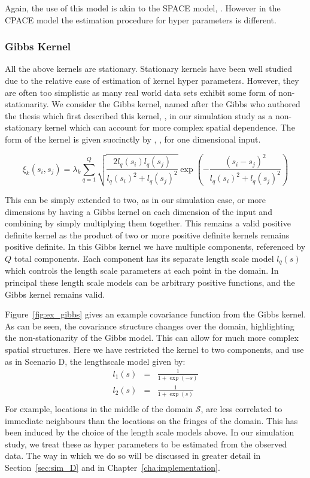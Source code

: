 Again, the use of this model is akin to the SPACE model, \citep{liu_functional_2017}.
However in the CPACE model the estimation procedure for hyper parameters is different.

\subsubsection{Gibbs Kernel \label{sssec:gibbs}}
All the above kernels are stationary.
Stationary kernels have been well studied due to the relative ease of estimation of kernel hyper parameters.
However, they are often too simplistic as many real world data sets exhibit some form of non-stationarity.
We consider the Gibbs kernel, named after the Gibbs who authored the thesis which first described this kernel, \citep{gibbs_bayesian_1998}, in our simulation study as a non-stationary kernel which can account for more complex spatial dependence.
The form of the kernel is given succinctly by \citeauthor{paciorek_spatial_2006}, \citep{paciorek_spatial_2006}, for one dimensional input. 

\begin{equation}
	\xi_k\left(s_{i}, s_{j}\right) = \lambda_k \sum_{q=1}^{Q} \sqrt{\frac{2l_q(s_i)l_q(s_j)}{l_q(s_i)^2 + l_q(s_j)^2}} \exp \left(-\frac{\left(s_i - s_j\right)^2}{l_q(s_i)^2 + l_q(s_j)^2}\right)
\end{equation}

This can be simply extended to two, as in our simulation case, or more dimensions by having a Gibbs kernel on each dimension of the input and combining by simply multiplying them together.
This remains a valid positive definite kernel as the product of two or more positive definite kernels remains positive definite. 
In this Gibbs kernel we have multiple components, referenced by $Q$ total components.
Each component has its separate length scale model $l_q(s)$ which controls the length scale parameters at each point in the domain.
In principal these length scale models can be arbitrary positive functions, and the Gibbs kernel remains valid.

Figure~\ref{fig:ex_gibbs} gives an example covariance function from the Gibbs kernel.
As can be seen, the covariance structure changes over the domain, highlighting the non-stationarity of the Gibbs model.
This can allow for much more complex spatial structures.
Here we have restricted the kernel to two components, and use as in Scenario D, the lengthscale model given by:
\begin{eqnarray}
	l_1(s) &=& \frac{1}{1 + \exp(-s)} \nonumber \\
	l_2(s) &=& \frac{1}{1 +  \exp(s)} \nonumber \\
\end{eqnarray}
For example, locations in the middle of the domain $\mathcal{S}$, are less correlated to immediate neighbours than the locations on the fringes of the domain.
This has been induced by the choice of the length scale models above.
In our simulation study, we treat these as hyper parameters to be estimated from the observed data.
The way in which we do so will be discussed in greater detail in Section~\ref{sec:sim_D} and in Chapter~\ref{cha:implementation}.

